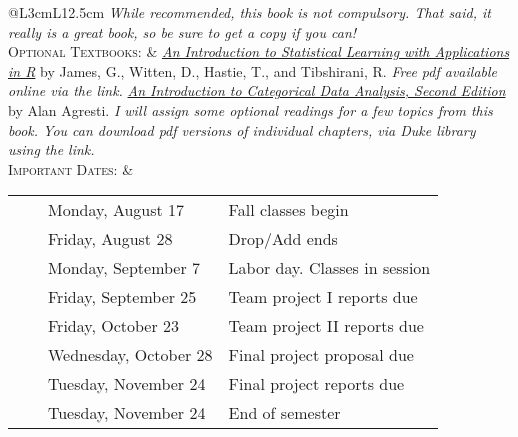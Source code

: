 \documentclass[11pt, a4paper]{article}
\newcommand{\tabitem}{~~\llap{\textbullet}~~}
\begin{document}
\begin{center}
\begin{minipage}[t]{.95\textwidth}
\begin{tabular}{@{}L{3cm}L{12.5cm}}
\newline \textit{While recommended, this book is not compulsory. That said, it really is a great book, so be sure to get a copy if you can!}\\ 
\textsc{Optional Textbooks:}	& \href{http://faculty.marshall.usc.edu/gareth-james/ISL/}{\textit{An Introduction to Statistical Learning with Applications in R}} by James, G., Witten, D., Hastie, T., and Tibshirani, R.
\newline \textit{Free pdf available online via the link.}
\newline  \href{https://find.library.duke.edu/catalog/DUKE005142588}{\textit{An Introduction to Categorical Data Analysis, Second Edition}} by Alan Agresti.
\newline \textit{I will assign some optional readings for a few topics from this book. You can download pdf versions of individual chapters, via Duke library using the link.}\\ 
\textsc{Important Dates:} & \begin{minipage}[t]{.95\textwidth}
	\begin{tabular}{@{}ll}
		\tabitem Monday, August 17	& Fall classes begin \\
		\tabitem Friday, August 28	& Drop/Add ends \\
		\tabitem Monday, September 7 & Labor day. Classes in session \\
		\tabitem Friday, September 25 & Team project I reports due \\
		\tabitem Friday, October 23 & Team project II reports due \\
		\tabitem Wednesday, October 28 & Final project proposal due \\
		\tabitem Tuesday, November 24 &	Final project reports due \\
		\tabitem Tuesday, November 24 &	End of semester \\
	\end{tabular}
\end{minipage} \\
	 \bottomrule[0.065cm]
\end{tabular}
\end{minipage}
\end{center}


\vspace{.5cm}
\setlength{\unitlength}{1in}
\renewcommand{\arraystretch}{1.5}
\end{document}
